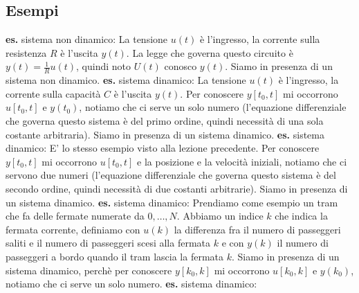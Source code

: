 \subsection{Esempi}
\textbf{es.} sistema non dinamico:\newline
La tensione $u(t)$ è l'ingresso, la corrente sulla resistenza $R$ è l'uscita $y(t)$. La legge che governa questo circuito è $y(t) = \frac{1}{R}u(t)$, quindi noto $U(t)$ conosco $y(t)$. Siamo in presenza di un sistema non dinamico.\newline
\newline
\textbf{es.} sistema dinamico:\newline
La tensione $u(t)$ è l'ingresso, la corrente sulla capacità $C$ è l'uscita $y(t)$. Per conoscere $y[t_0,t]$ mi occorrono $u[t_0,t]$ e $y(t_0)$, notiamo che ci serve un solo numero (l'equazione differenziale che governa questo sistema è del primo ordine, quindi necessità di una sola costante arbitraria). Siamo in presenza di un sistema dinamico.\newline
\newline
\textbf{es.} sistema dinamico:\newline
E' lo stesso esempio visto alla lezione precedente. Per conoscere $y[t_0,t]$ mi occorrono $u[t_0,t]$ e la posizione e la velocità iniziali, notiamo che ci servono due numeri (l'equazione differenziale che governa questo sistema è del secondo ordine, quindi necessità di due costanti arbitrarie). Siamo in presenza di un sistema dinamico.\newline
\newline
\textbf{es.} sistema dinamico:\newline
Prendiamo come esempio un tram che fa delle fermate numerate da $0, \dots, N$. Abbiamo un indice $k$ che indica la fermata corrente, definiamo con $u(k)$ la differenza fra il numero di passeggeri saliti e il numero di passeggeri scesi alla fermata $k$ e con $y(k)$ il numero di passeggeri a bordo quando il tram lascia la fermata $k$. Siamo in presenza di un sistema dinamico, perchè per conoscere $y[k_0,k]$ mi occorrono $u[k_0,k]$ e $y(k_0)$, notiamo che ci serve un solo numero.\newline
\newline
\textbf{es.} sistema dinamico:\newline
